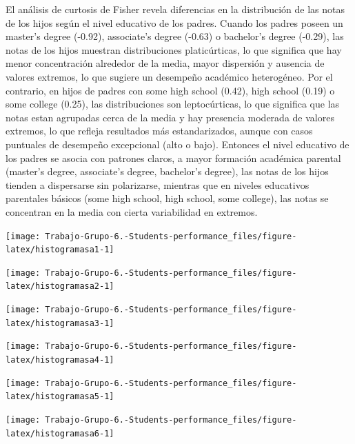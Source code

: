 \documentclass[
]{article}
\begin{document}
El análisis de curtosis de Fisher revela diferencias en la distribución
de las notas de los hijos según el nivel educativo de los padres. Cuando
los padres poseen un master's degree (-0.92), associate's degree (-0.63)
o bachelor's degree (-0.29), las notas de los hijos muestran
distribuciones platicúrticas, lo que significa que hay menor
concentración alrededor de la media, mayor dispersión y ausencia de
valores extremos, lo que sugiere un desempeño académico heterogéneo. Por
el contrario, en hijos de padres con some high school (0.42), high
school (0.19) o some college (0.25), las distribuciones son
leptocúrticas, lo que significa que las notas estan agrupadas cerca de
la media y hay presencia moderada de valores extremos, lo que refleja
resultados más estandarizados, aunque con casos puntuales de desempeño
excepcional (alto o bajo). Entonces el nivel educativo de los padres se
asocia con patrones claros, a mayor formación académica parental
(master's degree, associate's degree, bachelor's degree), las notas de
los hijos tienden a dispersarse sin polarizarse, mientras que en niveles
educativos parentales básicos (some high school, high school, some
college), las notas se concentran en la media con cierta variabilidad en
extremos.

\begin{center}\texttt{[image: Trabajo-Grupo-6.-Students-performance\_files/figure-latex/histogramasa1-1]} \end{center}

\begin{center}\texttt{[image: Trabajo-Grupo-6.-Students-performance\_files/figure-latex/histogramasa2-1]} \end{center}

\begin{center}\texttt{[image: Trabajo-Grupo-6.-Students-performance\_files/figure-latex/histogramasa3-1]} \end{center}

\begin{center}\texttt{[image: Trabajo-Grupo-6.-Students-performance\_files/figure-latex/histogramasa4-1]} \end{center}

\begin{center}\texttt{[image: Trabajo-Grupo-6.-Students-performance\_files/figure-latex/histogramasa5-1]} \end{center}

\begin{center}\texttt{[image: Trabajo-Grupo-6.-Students-performance\_files/figure-latex/histogramasa6-1]} \end{center}
\end{document}
